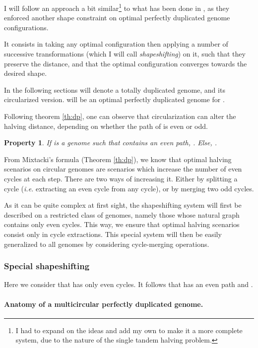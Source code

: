 \documentclass[11pt,final,twoside,nofrench]{thlifl}
\newtheorem{property}{Property}
\begin{document}
{I will follow an approach a bit similar\footnote{I had to
  expand on the ideas and add my own to make it a more complete system, due to the nature of the single tandem halving
  problem.} to what has been done in \cite{Kovac}, as
they enforced another shape constraint on optimal perfectly duplicated
genome configurations.

It consists in taking any optimal configuration then applying a number of
successive transformations (which I will call 
\emph{shapeshifting}) on it, such that they
preserve the distance, and that the optimal configuration converges
towards the desired shape.

In the following sections  will denote a totally duplicated
genome, and  its circularized version.  will be an optimal perfectly
duplicated genome for .

Following theorem \ref{th:dp}, one can observe that circularization can alter the halving distance, depending on whether the path of  is even or odd.

\begin{property}
\label{prop:dpgc}
If  is a genome such that  contains an even path, . Else, . 
\end{property}

From Mixtacki's formula (Theorem \ref{th:dp}), we know that optimal halving scenarios on circular genomes are scenarios which increase the number of even cycles at each step.
There are two ways of increasing it. Either by splitting a cycle (\textit{i.e.} extracting an even cycle from any cycle), or by merging two odd cycles.

As it can be quite complex at first sight, the shapeshifting system will first be described on a restricted class of genomes, namely those whose natural graph contains only even cycles. This way, we ensure that optimal halving scenarios consist only in cycle extractions.
This special system will then be easily generalized to all genomes by considering cycle-merging operations.

\subsubsection{Special shapeshifting}

Here we consider that  has only even cycles.
It follows that  has an even path and .

\paragraph{Anatomy of a multicircular perfectly duplicated genome.}

}
\end{document}
